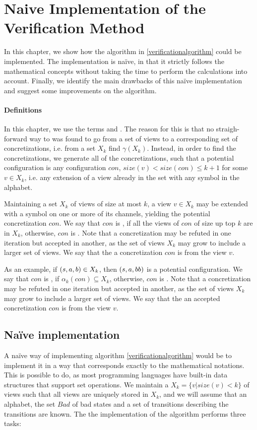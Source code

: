 \section{Naive Implementation of the Verification Method}
\label{naive}
In this chapter, we show how the algorithm in \ref{verificationalgorithm} could be implemented. The implementation is naïve, in that it strictly follows the mathematical concepts without taking the time to perform the calculations into account. Finally, we identify the main drawbacks of this naïve implementation and suggest some improvements on the algorithm.

\paragraph{Definitions}
In this chapter, we use the terms  and . The reason for this is that no straigh-forward way to was found to go from a set of views to a corresponding set of concretizations, i.e. from a set $X_k$ find $\gamma(X_k)$. Instead, in order to find the concretizations, we generate all of the  concretizations, such that a potential configuration is any configuration $con$, $size(v) < size(con) \leq k+1$ for some $v \in X_k$, i.e. any extension of a view already in the set with any symbol in the alphabet.

Maintaining a set $X_k$ of views of size at most $k$, a view $v\in X_k$ may be extended with a symbol on one or more of its channels, yielding the potential concretization $con$. We say that $con$ is , if all the views of $con$ of size up top $k$ are in $X_k$, otherwise, $con$ is . Note that a concretization may be refuted in one iteration but accepted in another, as the set of views $X_k$ may grow to include a larger set of views. We say that the a concretization $con$ is  from the view $v$.

As an example, if $(s, a, b) \in X_k$, then $(s, a, bb)$ is a potential configuration. We say that $con$ is , if $\alpha_k(con) \subseteq X_k$, otherwise, $con$ is . Note that a concretization may be refuted in one iteration but accepted in another, as the set of views $X_k$ may grow to include a larger set of views. We say that the an accepted concretization $con$ is  from the view $v$.

\subsection{Naïve implementation}
\label{apost}
A naïve way of implementing algorithm \ref{verificationalgorithm} would be to implement it in a way that corresponds exactly to the mathematical notations. This is possible to do, as most programming languages have built-in data structures that support set operations. We maintain a  $X_k = \{v | size(v) < k\}$ of views such that all views are uniquely stored in $X_k$, and we will assume that an alphabet, the set $Bad$ of bad states and a set of transitions  describing the transitions are known. The the implementation of the algorithm performs three tasks:


